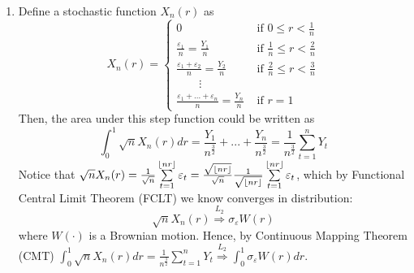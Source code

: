 \documentclass[]{article}
\DeclarePairedDelimiter\floor{\lfloor}{\rfloor}
\begin{document}
\begin{enumerate}[label = \alph*)]
	\item Define a stochastic function $X_n(r)$ as
	\begin{equation}
		X_n(r) = \begin{cases}0 & \text{ if }0\leq r<\frac{1}{n} \\
		\frac{\varepsilon_1}{n} = \frac{Y_1}{n} & \text{ if }\frac{1}{n}\leq r<\frac{2}{n} \\
		\frac{\varepsilon_1 + \varepsilon_2}{n} = \frac{Y_2}{n} & \text{ if }\frac{2}{n}\leq r<\frac{3}{n} \\
		\qquad\vdots\\
		\frac{\varepsilon_1 + ... + \varepsilon_n}{n} = \frac{Y_n}{n} & \text{ if }r = 1
		\end{cases}\nonumber
	\end{equation}
	Then, the area under this step function could be written as
	\begin{equation}
		\int_{0}^{1}\sqrt{n}X_n(r)dr = \frac{Y_1}{n^\frac{3}{2}} + ... + \frac{Y_n}{n^\frac{3}{2}} = \frac{1}{n^\frac{3}{2}}\sum\limits_{t = 1}^nY_t \nonumber
	\end{equation}
	Notice that $\sqrt{n}X_n(r) = \frac{1}{\sqrt{n}}\sum\limits_{t = 1}^{\floor*{nr}}\varepsilon_t = \frac{\sqrt{\floor*{nr}}}{\sqrt{n}}\frac{1}{\sqrt{\floor*{nr}}}\sum\limits_{t = 1}^{\floor*{nr}}\varepsilon_t$, which by Functional Central Limit Theorem (FCLT) we know converges in distribution:
	\begin{equation}
		\sqrt{n}X_n(r) \overset{L_2}{\Longrightarrow} \sigma_\varepsilon W(r) \nonumber
	\end{equation}
	where $W(\cdot)$ is a Brownian motion.
	Hence, by Continuous Mapping Theorem (CMT) $\int_{0}^{1}\sqrt{n}X_n(r)dr = \frac{1}{n^\frac{3}{2}}\sum\limits_{t = 1}^nY_t \overset{L_2}{\Longrightarrow} \int_{0}^{1}\sigma_\varepsilon W(r)dr$.
	

\end{enumerate}
\end{document}
